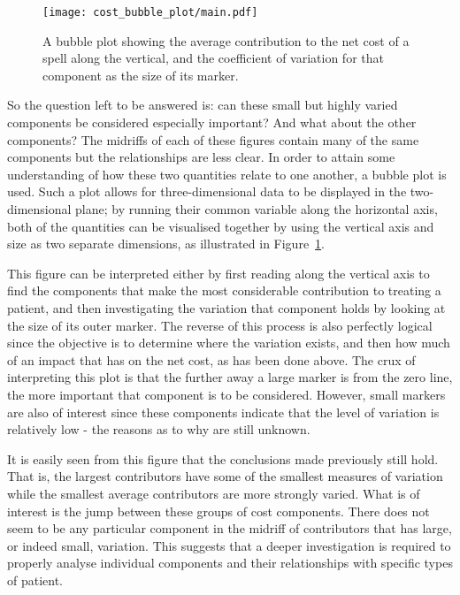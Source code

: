 \begin{figure}[htbp]
    \centering
    \texttt{[image: cost\_bubble\_plot/main.pdf]}
    \caption{A bubble plot showing the average contribution to the net cost of a
    spell along the vertical, and the coefficient of variation for that
    component as the size of its marker.}\label{fig:cost_bubble_plot}
\end{figure}

So the question left to be answered is: can these small but highly varied
components be considered especially important? And what about the other
components? The midriffs of each of these figures contain many of the same
components but the relationships are less clear. In order to attain some
understanding of how these two quantities relate to one another, a bubble plot
is used. Such a plot allows for three-dimensional data to be displayed in the
two-dimensional plane; by running their common variable along the horizontal
axis, both of the quantities can be visualised together by using the vertical
axis and size as two separate dimensions, as illustrated in
Figure~\ref{fig:cost_bubble_plot}.

This figure can be interpreted either by first reading along the vertical axis
to find the components that make the most considerable contribution to treating
a patient, and then investigating the variation that component holds by looking
at the size of its outer marker. The reverse of this process is also perfectly
logical since the objective is to determine where the variation exists, and then
how much of an impact that has on the net cost, as has been done above. The crux
of interpreting this plot is that the further away a large marker is from the
zero line, the more important that component is to be considered. However, small
markers are also of interest since these components indicate that the level of
variation is relatively low \-- the reasons as to why are still unknown.

It is easily seen from this figure that the conclusions made previously still
hold. That is, the largest contributors have some of the smallest measures of
variation while the smallest average contributors are more strongly varied. What
is of interest is the jump between these groups of cost components. There does
not seem to be any particular component in the midriff of contributors that has
large, or indeed small, variation. This suggests that a deeper investigation is
required to properly analyse individual components and their relationships with
specific types of patient.
